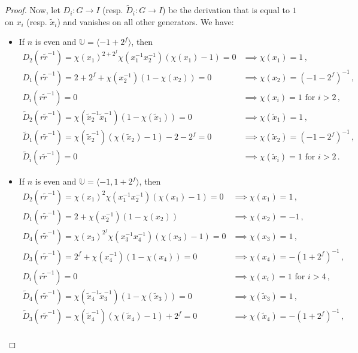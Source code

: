 \documentclass[a4paper]{amsart}
\theoremstyle{definition}
\begin{document}
\begin{proof}
Now, let \(D_i\colon G \to I\) (resp. \(\widetilde{D}_i\colon G \to I\)) be the derivation that is equal to \(1\) on \(x_i\) (resp. \(\widetilde{x}_i\)) and vanishes on all other generators. We have:
\begin{itemize}
    \item If \(n\) is even and \(\mathbb{U} = \langle -1 + 2^f\rangle\), then 
    \begin{align*}
        D_2(r\widetilde{r}^{-1}) = \chi(x_1)^{2+2^f}\chi(x_1^{-1}x_2^{-1})(\chi(x_1)-1) = 0 & \implies \chi(x_1) = 1\,,\\
        D_1(r\widetilde{r}^{-1}) = 2+2^f + \chi(x_2^{-1})(1-\chi(x_2)) = 0 &\implies \chi(x_2) = (-1 -2^f)^{-1}\,,\\
        D_i(r\widetilde{r}^{-1}) = 0 & \implies \chi(x_i) = 1\text{ for }i>2\,,\\
        \widetilde{D}_2(r\widetilde{r}^{-1}) = \chi(\widetilde{x}_2^{-1}\widetilde{x}_1^{-1})(1-\chi(\widetilde{x}_1)) = 0 &\implies \chi(\widetilde{x}_1) = 1\,,\\
        \widetilde{D}_1(r\widetilde{r}^{-1}) = \chi(\widetilde{x}_2^{-1})(\chi(\widetilde{x}_2)-1) - 2-2^f = 0 & \implies \chi(\widetilde{x}_2)= (-1-2^f)^{-1}\,,\\
        \widetilde{D}_i(r\widetilde{r}^{-1}) = 0 &\implies \chi(\widetilde{x}_i) = 1\text{ for }i > 2\,.\end{align*}
    \item If \(n\) is even and \(\mathbb{U} = \langle -1, 1+2^f\rangle\), then
    \begin{align*}
        D_2(r\widetilde{r}^{-1}) = \chi(x_1)^2\chi(x_1^{-1}x_2^{-1})(\chi(x_1)-1) = 0 & \implies \chi(x_1) = 1\,,\\
        D_1(r\widetilde{r}^{-1}) = 2 + \chi(x_2^{-1})(1-\chi(x_2))&\implies \chi(x_2) = -1\,,\\
        D_4(r\widetilde{r}^{-1}) = \chi(x_3)^{2^f}\chi(x_3^{-1}x_4^{-1})(\chi(x_3)-1) = 0 &\implies \chi(x_3) =1\,,\\
        D_3(r\widetilde{r}^{-1}) = 2^f + \chi(x_4^{-1})(1-\chi(x_4)) = 0 &\implies \chi(x_4) = -(1+2^f)^{-1}\,,\\
        D_i(r\widetilde{r}^{-1}) = 0 &\implies \chi(x_i) = 1\text{ for }i>4\,,\\
        \widetilde{D}_4(r\widetilde{r}^{-1}) = \chi(\widetilde{x}_4^{-1}\widetilde{x}_3^{-1})(1-\chi(\widetilde{x}_3)) = 0&\implies \chi(\widetilde{x}_3) = 1\,,\\
        \widetilde{D}_3(r\widetilde{r}^{-1}) = \chi(\widetilde{x}_4^{-1})(\chi(\widetilde{x}_4) - 1) + 2^f = 0 & \implies \chi(\widetilde{x}_4) = -(1+2^f)^{-1}\,,\\

\end{align*}
\end{itemize}
\end{proof}
\end{document}
